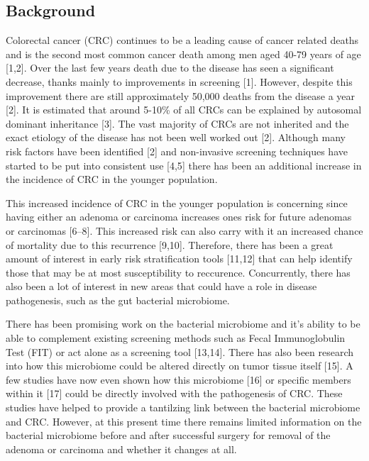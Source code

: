 \documentclass[12pt,]{article}
\begin{document}
\subsection{Background}\label{background}

Colorectal cancer (CRC) continues to be a leading cause of cancer
related deaths and is the second most common cancer death among men aged
40-79 years of age {[}1,2{]}. Over the last few years death due to the
disease has seen a significant decrease, thanks mainly to improvements
in screening {[}1{]}. However, despite this improvement there are still
approximately 50,000 deaths from the disease a year {[}2{]}. It is
estimated that around 5-10\% of all CRCs can be explained by autosomal
dominant inheritance {[}3{]}. The vast majority of CRCs are not
inherited and the exact etiology of the disease has not been well worked
out {[}2{]}. Although many risk factors have been identified {[}2{]} and
non-invasive screening techniques have started to be put into consistent
use {[}4,5{]} there has been an additional increase in the incidence of
CRC in the younger population.

This increased incidence of CRC in the younger population is concerning
since having either an adenoma or carcinoma increases ones risk for
future adenomas or carcinomas {[}6--8{]}. This increased risk can also
carry with it an increased chance of mortality due to this recurrence
{[}9,10{]}. Therefore, there has been a great amount of interest in
early risk stratification tools {[}11,12{]} that can help identify those
that may be at most susceptibility to reccurence. Concurrently, there
has also been a lot of interest in new areas that could have a role in
disease pathogenesis, such as the gut bacterial microbiome.

There has been promising work on the bacterial microbiome and it's
ability to be able to complement existing screening methods such as
Fecal Immunoglobulin Test (FIT) or act alone as a screening tool
{[}13,14{]}. There has also been research into how this microbiome could
be altered directly on tumor tissue itself {[}15{]}. A few studies have
now even shown how this microbiome {[}16{]} or specific members within
it {[}17{]} could be directly involved with the pathogenesis of CRC.
These studies have helped to provide a tantilzing link between the
bacterial microbiome and CRC. However, at this present time there
remains limited information on the bacterial microbiome before and after
successful surgery for removal of the adenoma or carcinoma and whether
it changes at all.
\end{document}
